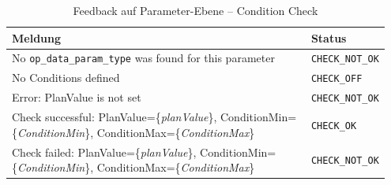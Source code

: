 \begin{table}[!htb]
    \centering
    \caption{Feedback auf Parameter-Ebene -- Condition Check}
    \footnotesize
    \renewcommand{\arraystretch}{1.1}
    \begin{tabular}{p{0.8\linewidth} p{0.15\linewidth}}
        \textbf{Meldung} & \textbf{Status} \\
        \midrule
        No \texttt{op\_data\_param\_type} was found for this parameter & \texttt{CHECK\_NOT\_OK} \\
        \midrule
        No Conditions defined & \texttt{CHECK\_OFF} \\
        \midrule
        Error: PlanValue is not set & \texttt{CHECK\_NOT\_OK} \\
        \midrule
        Check successful: PlanValue=\{\textit{planValue}\}, ConditionMin=\{\textit{ConditionMin}\}, ConditionMax=\{\textit{ConditionMax}\} & \texttt{CHECK\_OK} \\
        \midrule
        Check failed: PlanValue=\{\textit{planValue}\}, ConditionMin=\{\textit{ConditionMin}\}, ConditionMax=\{\textit{ConditionMax}\} & \texttt{CHECK\_NOT\_OK} \\
        \bottomrule
    \end{tabular}
    \label{tab:feedback-condition}
\end{table}


